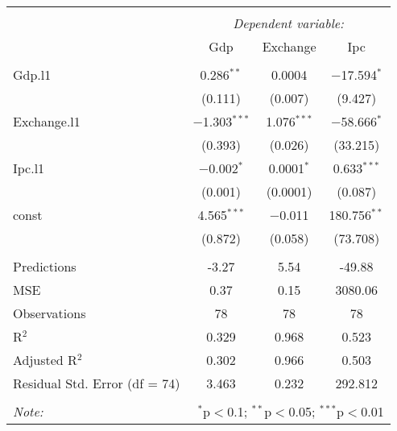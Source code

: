 
\begin{table}[H] \centering 
  \caption{} 
  \label{tb:var1} 
\begin{tabular}{@{\extracolsep{5pt}}lccc} 
\\[-1.8ex]\hline 
\hline \\[-1.8ex] 
 & \multicolumn{3}{c}{\textit{Dependent variable:}} \\ 
\cline{2-4} 
 & Gdp & Exchange & Ipc \\ 
\hline \\[-1.8ex] 
 Gdp.l1 & 0.286$^{**}$ & 0.0004 & $-$17.594$^{*}$ \\ 
  & (0.111) & (0.007) & (9.427) \\ 
  Exchange.l1 & $-$1.303$^{***}$ & 1.076$^{***}$ & $-$58.666$^{*}$ \\ 
  & (0.393) & (0.026) & (33.215) \\ 
  Ipc.l1 & $-$0.002$^{*}$ & 0.0001$^{*}$ & 0.633$^{***}$ \\ 
  & (0.001) & (0.0001) & (0.087) \\ 
  const & 4.565$^{***}$ & $-$0.011 & 180.756$^{**}$ \\ 
  & (0.872) & (0.058) & (73.708) \\ 
 \hline \\[-1.8ex] 
Predictions & -3.27 & 5.54 & -49.88 \\ 
MSE & 0.37 & 0.15 & 3080.06 \\ 
Observations & 78 & 78 & 78 \\ 
R$^{2}$ & 0.329 & 0.968 & 0.523 \\ 
Adjusted R$^{2}$ & 0.302 & 0.966 & 0.503 \\ 
Residual Std. Error (df = 74) & 3.463 & 0.232 & 292.812 \\ 
\hline 
\hline \\[-1.8ex] 
\textit{Note:}  & \multicolumn{3}{r}{$^{*}$p$<$0.1; $^{**}$p$<$0.05; $^{***}$p$<$0.01} \\ 
\end{tabular} 
\end{table} 
